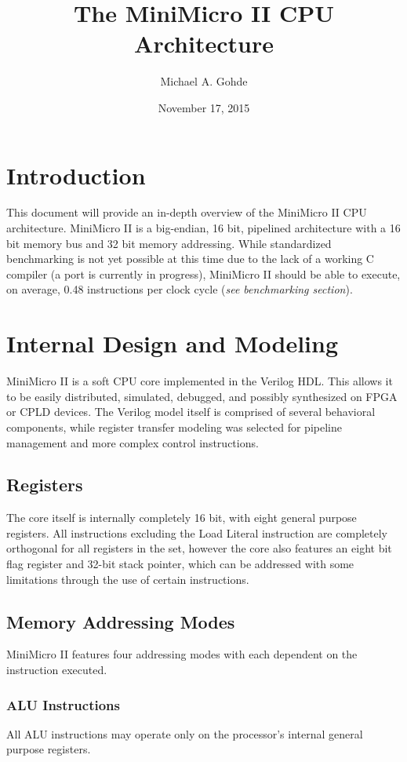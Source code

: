 \documentclass[12pt,letterpaper]{article}
\begin{document}
\title{The MiniMicro II CPU Architecture}
\author{Michael A. Gohde}
\date{November 17, 2015}
\maketitle

\section{Introduction}
This document will provide an in-depth overview of the MiniMicro II CPU architecture. MiniMicro II is a big-endian, 16 bit, pipelined architecture with a 16 bit memory bus and 32 bit memory addressing. While standardized benchmarking is not yet possible at this time due to the lack of a working C compiler (a port is currently in progress), MiniMicro II should be able to execute, on average, 0.48 instructions per clock cycle (\textit{see benchmarking section}). 

\section{Internal Design and Modeling}
MiniMicro II is a soft CPU core implemented in the Verilog HDL. This allows it to be easily distributed, simulated, debugged, and possibly synthesized on FPGA or CPLD devices. The Verilog model itself is comprised of several behavioral components, while register transfer modeling was selected for pipeline management and more complex control instructions. 

\subsection{Registers}
The core itself is internally completely 16 bit, with eight general purpose registers. All instructions excluding the Load Literal instruction are completely orthogonal for all registers in the set, however the core also features an eight bit flag register and 32-bit stack pointer, which can be addressed with some limitations through the use of certain instructions. 

\subsection{Memory Addressing Modes}
MiniMicro II features four addressing modes with each dependent on the instruction executed. 

\subsubsection{ALU Instructions}
All ALU instructions may operate only on the processor's internal general purpose registers. 
\end{document}

